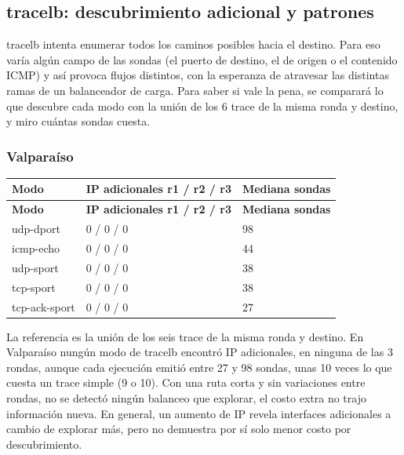 \subsection{tracelb: descubrimiento adicional y patrones}\label{sec:lb}

tracelb intenta enumerar todos los caminos posibles hacia el destino. Para eso varía algún campo de las sondas (el puerto de destino, el de origen o el contenido ICMP) y así provoca flujos distintos, con la esperanza de atravesar las distintas ramas de un balanceador de carga. Para saber si vale la pena, se comparará lo que descubre cada modo con la unión de los 6 trace de la misma ronda y destino, y miro cuántas sondas cuesta.

\subsubsection{Valparaíso}
\begingroup
\fontsize{9}{11}\selectfont
\addtocounter{table}{-1}
\begin{longtable}{p{3.2cm}p{8cm}p{3cm}}
\toprule
\textbf{Modo} & \textbf{IP adicionales r1 / r2 / r3} & \textbf{Mediana sondas} \\ \midrule
\endfirsthead
\toprule
\textbf{Modo} & \textbf{IP adicionales r1 / r2 / r3} & \textbf{Mediana sondas} \\ \midrule
\endhead
udp-dport & 0 / 0 / 0 & 98 \\
icmp-echo & 0 / 0 / 0 & 44 \\
udp-sport & 0 / 0 / 0 & 38 \\
tcp-sport & 0 / 0 / 0 & 38 \\
tcp-ack-sport & 0 / 0 / 0 & 27 \\
\bottomrule
\end{longtable}
\endgroup
La referencia es la unión de los seis trace de la misma ronda y destino. En Valparaíso nungún modo de tracelb  encontró IP adicionales, en ninguna de las 3 rondas, aunque cada ejecución emitió entre 27 y 98 sondas, unas 10 veces lo que cuesta un trace simple (9 o 10). Con una ruta corta y sin variaciones entre rondas, no se detectó ningún balanceo que explorar, el costo extra no trajo información nueva. En general, un aumento de IP revela interfaces adicionales a cambio de explorar más, pero no demuestra por sí solo menor costo por descubrimiento.

